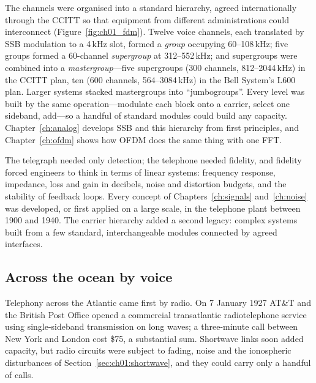 The channels were organised into a standard hierarchy, agreed internationally through the CCITT so
that equipment from different administrations could interconnect (Figure~\ref{fig:ch01_fdm}). Twelve
voice channels, each translated by SSB modulation to a 4\,kHz slot, formed a \emph{group} occupying
60--108\,kHz; five groups formed a 60-channel \emph{supergroup} at 312--552\,kHz; and supergroups were
combined into a \emph{mastergroup}---five supergroups (300 channels, 812--2044\,kHz) in the CCITT plan,
ten (600 channels, 564--3084\,kHz) in the Bell System's L600 plan. Larger systems stacked mastergroups
into ``jumbogroups''. Every level was built by the same operation---modulate each block onto a carrier,
select one sideband, add---so a handful of standard modules could build any capacity.
Chapter~\ref{ch:analog} develops SSB and this hierarchy from first principles, and
Chapter~\ref{ch:ofdm} shows how OFDM does the same thing with one FFT.


\begin{keyidea}
The telegraph needed only detection; the telephone needed fidelity, and fidelity forced engineers
to think in terms of linear systems: frequency response, impedance, loss and gain in decibels,
noise and distortion budgets, and the stability of feedback loops. Every concept of
Chapters~\ref{ch:signals} and~\ref{ch:noise} was developed, or first applied on a large scale, in the
telephone plant between 1900 and 1940. The carrier hierarchy added a second legacy: complex systems
built from a few standard, interchangeable modules connected by agreed interfaces.
\end{keyidea}

\subsection{Across the ocean by voice}

Telephony across the Atlantic came first by radio. On 7 January 1927 AT\&T and the British Post
Office opened a commercial transatlantic radiotelephone service using single-sideband transmission on
long waves; a three-minute call between New York and London cost \$75, a substantial sum. Shortwave
links soon added capacity, but radio circuits were subject to fading, noise and the ionospheric
disturbances of Section~\ref{sec:ch01:shortwave}, and they could carry only a handful of calls.

